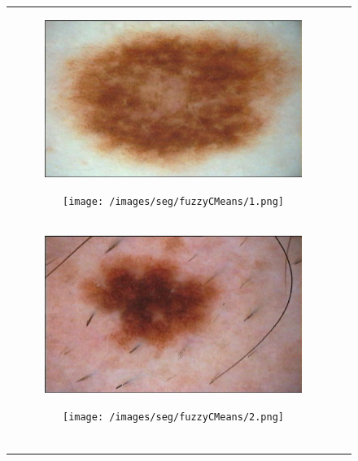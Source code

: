 \documentclass[a4paper, 10pt, conference]{ieeeconf}        %
\begin{document}
\begin{figure}[ht!]
 \centering
 \begin{tabular}{c c}
 \begin{subfigure}{0.2\textwidth}
 \includegraphics[scale=0.15]{original01.JPG}\caption{}
 \end{subfigure}
 \begin{subfigure}{0.2\textwidth}
 \texttt{[image: /images/seg/fuzzyCMeans/1.png]}\caption{}
 \end{subfigure}\\
 \begin{subfigure}{0.2\textwidth}
  \includegraphics[scale=0.15]{original02.JPG}\caption{}
  \end{subfigure}
  \begin{subfigure}{0.2\textwidth}
  \texttt{[image: /images/seg/fuzzyCMeans/2.png]}\caption{}
  \end{subfigure}\\
 \begin{subfigure}{0.2\textwidth}

\end{subfigure}
\end{tabular}
\end{figure}
\end{document}
